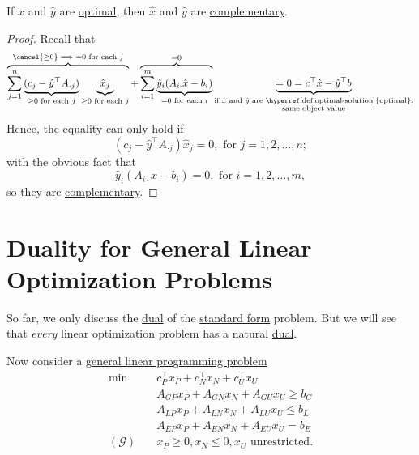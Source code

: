 \begin{theorem}\label{thm:strong-complementary-slackness-theorem}
	If \(\hat{x}\) and \(\hat{y}\) are \hyperref[def:optimal-solution]{optimal}, then \(\hat{x}\) and \(\hat{y}\) are \hyperref[def:complementary]{complementary}.
\end{theorem}
\begin{proof}
	Recall that
	\[
		\overbrace{\sum\limits_{j=1}^{n} \underbrace{(c_{j}-\hat{y}^{\top}A_{\cdot j})}_{ \geq 0\text{ for each }j}\underbrace{\hat{x}_{j}}_{\geq 0 \text{ for each }j}}^{\cancel{\geq 0}\implies = 0\text{ for each }j}
		+ \overbrace{\sum\limits_{i=1}^{m} \underbrace{\hat{y}_i(A_{i\cdot}\hat{x} - b_{i})}_{ = 0\text{ for each }i}}^{=0}
		\underbrace{= 0 = c^{\top}\hat{x} - \hat{y}^{\top}b}_{\substack{\text{if }\hat{x}\text{ and }\hat{y}\text{ are \hyperref[def:optimal-solution]{optimal}:}\\ \text{same object value}}}
	\]
	Hence, the equality can only hold if
	\[
		(c_{j} - \hat{y}^{\top}A_{\cdot j})\hat{x}_j = 0, \text{ for }j = 1, 2, \ldots , n;
	\]
	with the obvious fact that
	\[
		\hat{y}_i(A_{i\cdot}\hat{x} - b_{i}) = 0, \text{ for }i = 1, 2, \ldots , m,
	\]
	so they are \hyperref[def:complementary]{complementary}.
\end{proof}

\section{Duality for General Linear Optimization Problems}
So far, we only discuss the \hyperref[def:dual]{dual} of the \hyperref[def:standard-form]{standard form} problem. But we will see that \emph{every}
linear optimization problem has a natural \hyperref[def:dual]{dual}.

Now consider a \hyperref[def:general-linear-programming-problem]{general linear programming problem}
\begin{align*}
	\min~              & c^{\top}_P x_P + c^{\top}_N x_N + c^{\top}_U x_U \\
	                   & A_{GP}x_P +A_{GN}x_N + A_{GU}x_U\geq b_G         \\
	                   & A_{LP}x_P +A_{LN}x_N + A_{LU}x_U \leq b_L        \\
	                   & A_{EP}x_P +A_{EN}x_N + A_{EU}x_U = b_E           \\
	(\mathcal{G})\quad & x_P\geq 0, x_N \leq 0, x_U \text{ unrestricted}.
\end{align*}

